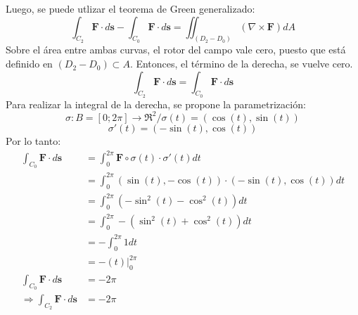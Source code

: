 \begin{solution}
\begin{center}
\begin{tikzpicture}
        \end{tikzpicture}
    \end{center}
    Luego, se puede utlizar el teorema de Green generalizado:
    \begin{equation*}
        \int_{C_2}\boldsymbol{F}\cdot d\boldsymbol{s} - \int_{C_0}\boldsymbol{F}\cdot d\boldsymbol{s} = \iint_{\left(D_2-D_0\right)}\left(\nabla \times \boldsymbol{F}\right)dA
    \end{equation*}
    Sobre el área entre ambas curvas, el rotor del campo vale cero, puesto que está definido en $\left(D_2-D_0\right)\subset A$. Entonces, el término de la derecha, se vuelve cero.
    \begin{equation*}
        \int_{C_2}\boldsymbol{F}\cdot d\boldsymbol{s} = \int_{C_0}\boldsymbol{F}\cdot d\boldsymbol{s}
    \end{equation*}
    Para realizar la integral de la derecha, se propone la parametrización:
    \begin{equation*}
        \sigma: B=[0;2\pi] \longrightarrow \Re^2 / \sigma(t) = (\cos(t),\sin(t))
    \end{equation*}
    \begin{equation*}
        \sigma'(t)=(-\sin(t),\cos(t))
    \end{equation*}
    Por lo tanto:
    \begin{align*}
        \int_{C_0}\boldsymbol{F}\cdot d\boldsymbol{s}&=\int_{0}^{2\pi}\boldsymbol{F}\circ\sigma(t) \cdot \sigma'(t) dt\\
        &=\int_{0}^{2\pi} (\sin(t),-\cos(t)) \cdot (-\sin(t),\cos(t)) dt\\
        &=\int_{0}^{2\pi} \left(-\sin^2(t)-\cos^2(t)\right) dt\\
        &=\int_{0}^{2\pi} -\left(\sin^2(t)+\cos^2(t)\right) dt\\
        &=-\int_{0}^{2\pi} 1 dt\\
        &=-\left.\left(t\right)\right|_{0}^{2\pi}\\
        \int_{C_0}\boldsymbol{F}\cdot d\boldsymbol{s}&=-2\pi\\
        \Rightarrow \int_{C_2}\boldsymbol{F}\cdot d\boldsymbol{s}&=-2\pi
    \end{align*}
\end{solution}


